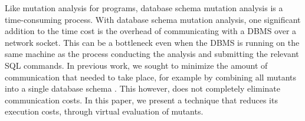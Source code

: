 Like mutation analysis for programs, database schema mutation analysis is a time-consuming process. With database schema mutation analysis, one significant addition to the time cost is the overhead of communicating with a DBMS over a network socket. This can be a bottleneck even when the DBMS is running on the same machine as the process conducting the analysis and submitting the relevant SQL commands. In previous work, we sought to minimize the amount of communication that needed to take place, for example by combining all mutants into a single database schema \cite{Wright2013}. This however, does not completely eliminate communication costs. In this paper, we present a technique that reduces its execution costs, through virtual evaluation of mutants. 


